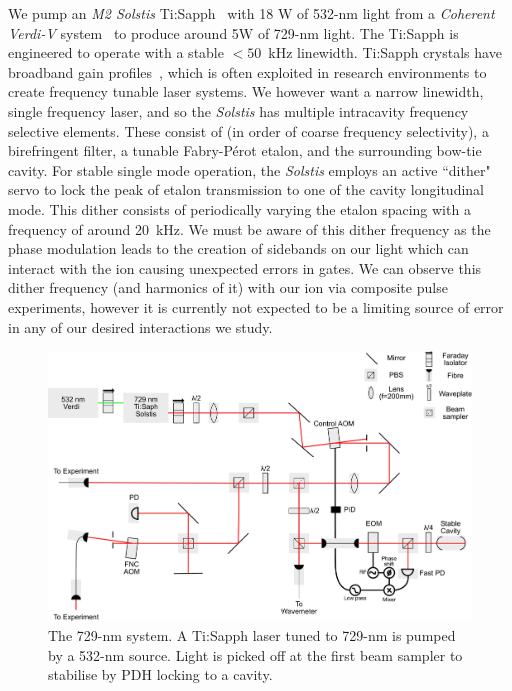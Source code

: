     We pump an \emph{M2 Solstis} Ti:Sapph~\cite{XXX} with 18 W of 532-nm light
    from a \emph{Coherent Verdi-V} system~\cite{XXX} to produce around 5W of
    729-nm light.  The Ti:Sapph is engineered to operate with a stable $<50$~kHz
    linewidth. Ti:Sapph crystals have broadband gain profiles~\cite{XXX}, which
    is often exploited in research environments to create frequency tunable
    laser systems. We however want a narrow linewidth, single frequency laser,
    and so the \emph{Solstis} has multiple intracavity frequency selective
    elements. These consist of (in order of coarse frequency selectivity), a
    birefringent filter, a tunable Fabry-P\'erot etalon, and the surrounding
    bow-tie cavity. For stable single mode operation, the \emph{Solstis} employs
    an active ``dither" servo to lock the peak of etalon transmission to one of
    the cavity longitudinal mode. This dither consists of periodically varying
    the etalon spacing with a frequency of around 20~kHz. We must be aware of
    this dither frequency as the phase modulation leads to the creation of
    sidebands on our light which can interact with the ion causing unexpected
    errors in gates. We can observe this dither frequency (and harmonics of it)
    with our ion via composite pulse experiments, however it is currently not
    expected to be a limiting source of error in any of our desired interactions
    we study.\\
    \begin{figure}
    \begin{center}
    \noindent\includegraphics[width=0.9\linewidth]{figures/pdf_figure/729_path_small.pdf}
    \end{center}
    \caption{The 729-nm system. A Ti:Sapph laser tuned to 729-nm is
        pumped by a 532-nm source. Light is picked off at the first beam
        sampler to stabilise by PDH locking to a cavity.}
    \label{fig:729}
    \end{figure}
